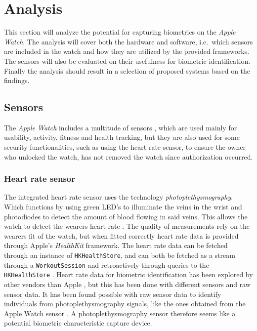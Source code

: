 \section{Analysis}
This section will analyze the potential for capturing biometrics on the
\textit{Apple Watch}. The analysis will cover both the hardware and
software, i.e.\ which sensors are included in the watch and how they are 
utilized by the provided frameworks. The sensors will also be evaluated 
on their usefulness for biometric identification. Finally the analysis 
should result in a selection of proposed systems based on the findings.

\subsection{Sensors}
The \textit{Apple Watch} includes a multitude of sensors \cite{Ap16}, 
which are used mainly for usability, activity, fitness and health tracking, but
they are also used for some security functionalities, such as using the heart 
rate sensor, to ensure the owner who unlocked the watch, has not removed the 
watch since authorization occurred.

\subsubsection{Heart rate sensor}
The integrated heart rate sensor uses the technology
\textit{photoplethysmography}. Which functions by using green LED's to
illuminate the veins in the wrist and photodiodes to detect the amount of blood
flowing in said veins. This allows the watch to detect the wearers heart rate
\cite{watchheartrate}.
The quality of measurements rely on the wearers fit of the watch, but when
fitted correctly heart rate data is provided through Apple's \textit{HealthKit}
framework. The heart rate data can be fetched through an instance of
\texttt{HKHealthStore}, and can both be fetched as a stream through a
\texttt{WorkoutSession} and retroactively through queries to the
\texttt{HKHealthStore} \cite{healthkitfw}.
Heart rate data for biometric identification has been explored by other vendors
than Apple \cite{nymiwhitepaper}, but this has been done with different sensors
and raw sensor data. It has been found possible with raw sensor data to identify
individuals from photoplethysmography signals, like the ones obtained from the
Apple Watch sensor \cite{kavsaoglu2013a}. A photoplethysmography sensor
therefore seems like a potential biometric characteristic capture device.


